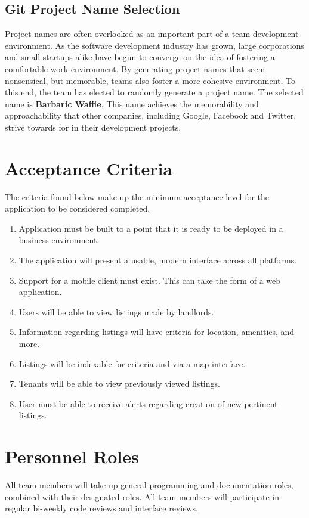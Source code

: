 \documentclass[]{article}
\begin{document}
\subsection{Git Project Name Selection}
Project names are often overlooked as an important part of a team development environment. As the software development industry has grown, large corporations and small startups alike have begun to converge on the idea of fostering a comfortable work environment. By generating project names that seem nonsensical, but memorable, teams also foster a more cohesive environment. To this end, the team has elected to randomly generate a project name. The selected name is \textbf{Barbaric Waffle}. This name achieves the memorability and approachability that other companies, including Google, Facebook and Twitter, strive towards for in their development projects.

\section{Acceptance Criteria}
The criteria found below make up the minimum acceptance level for the application to be considered completed.
\begin{enumerate}
	\item Application must be built to a point that it is ready to be deployed in a business environment.
	\item The application will present a usable, modern interface across all platforms.
	\item Support for a mobile client must exist. This can take the form of a web application.
	\item Users will be able to view listings made by landlords.
	\item Information regarding listings will have criteria for location, amenities, and more.
	\item Listings will be indexable for criteria and via a map interface.
	\item Tenants will be able to view previously viewed listings.
	\item User must be able to receive alerts regarding creation of new pertinent listings.
\end{enumerate}

\section{Personnel Roles}
All team members will take up general programming and documentation roles, combined with their designated roles. All team members will participate in regular bi-weekly code reviews and interface reviews.
\end{document}

